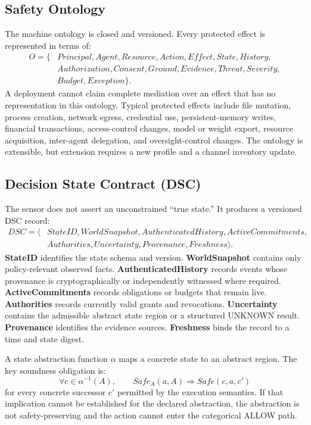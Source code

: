 \documentclass[11pt]{article}
\def\ensuremath#1{#1}%
\def\mathsf#1{#1}%
\def\mathcal#1{#1}%
\newcommand{\DSC}{\ensuremath{\mathsf{DSC}}}
\newcommand{\Safe}{\ensuremath{\mathsf{Safe}}}
\newcommand{\ALLOW}{\ensuremath{\mathsf{ALLOW}}}
\newcommand{\UNKNOWN}{\ensuremath{\mathsf{UNKNOWN}}}
\begin{document}
\subsection{Safety Ontology}
The machine ontology is closed and versioned. Every protected effect is represented in terms of:
\[
\begin{aligned}
\mathcal{O}=\{&Principal,Agent,Resource,Action,Effect,State,History,\\
&Authorization,Consent,Ground,Evidence,Threat,Severity,\\
&Budget,Exception\}.
\end{aligned}
\]
A deployment cannot claim complete mediation over an effect that has no representation in this ontology. Typical protected effects include file mutation, process creation, network egress, credential use, persistent-memory writes, financial transactions, access-control changes, model or weight export, resource acquisition, inter-agent delegation, and oversight-control changes. The ontology is extensible, but extension requires a new profile and a channel inventory update.

\subsection{Decision State Contract (DSC)}\label{sec:dsc}
The sensor does not assert an unconstrained ``true state.'' It produces a versioned \DSC{} record:
\[
\begin{aligned}
\DSC=\langle&StateID,WorldSnapshot,AuthenticatedHistory,ActiveCommitments,\\
&Authorities,Uncertainty,Provenance,Freshness\rangle.
\end{aligned}
\]
\textbf{StateID} identifies the state schema and version. \textbf{WorldSnapshot} contains only policy-relevant observed facts. \textbf{AuthenticatedHistory} records events whose provenance is cryptographically or independently witnessed where required. \textbf{ActiveCommitments} records obligations or budgets that remain live. \textbf{Authorities} records currently valid grants and revocations. \textbf{Uncertainty} contains the admissible abstract state region or a structured \UNKNOWN{} result. \textbf{Provenance} identifies the evidence sources. \textbf{Freshness} binds the record to a time and state digest.

A state abstraction function \(\alpha\) maps a concrete state to an abstract region. The key soundness obligation is:
\[
\forall c\in \alpha^{-1}(A),\qquad \Safe_A(a,A)\Rightarrow\Safe(c,a,c')
\]
for every concrete successor \(c'\) permitted by the execution semantics. If that implication cannot be established for the declared abstraction, the abstraction is not safety-preserving and the action cannot enter the categorical \ALLOW{} path.
\end{document}
